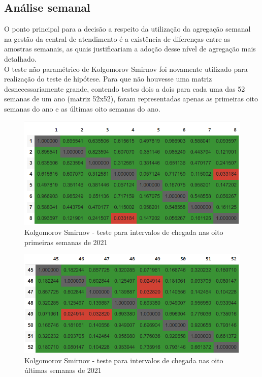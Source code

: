 \subsection{Análise semanal}
O ponto principal para a decisão a respeito da utilização da agregação semanal na gestão da central de atendimento é a existência de diferenças entre as amostras semanais, as quais justificariam a adoção desse nível de agregação mais detalhado.\\
O teste não paramétrico de Kolgomorov Smirnov foi novamente utilizado para realização do teste de hipótese. Para que não houvesse uma matriz desnecessariamente grande, contendo testes dois a dois para cada uma das 52 semanas de um ano (matriz 52x52), foram representadas apenas as primeiras oito semanas do ano e as últimas oito semanas do ano.

\begin{figure}[H]
    \includegraphics{analise-de-dados/semanal/janas.png}
    \caption{Kolgomorov Smirnov - teste para intervalos de chegada nas oito primeiras semanas de 2021}
    \label{fig: jan_as_img}
\end{figure}

\begin{figure}[H]
    \includegraphics{analise-de-dados/semanal/dezas.png}
    \caption{Kolgomorov Smirnov - teste para intervalos de chegada nas oito últimas semanas de 2021}
    \label{fig: dez_as_img}
\end{figure}

